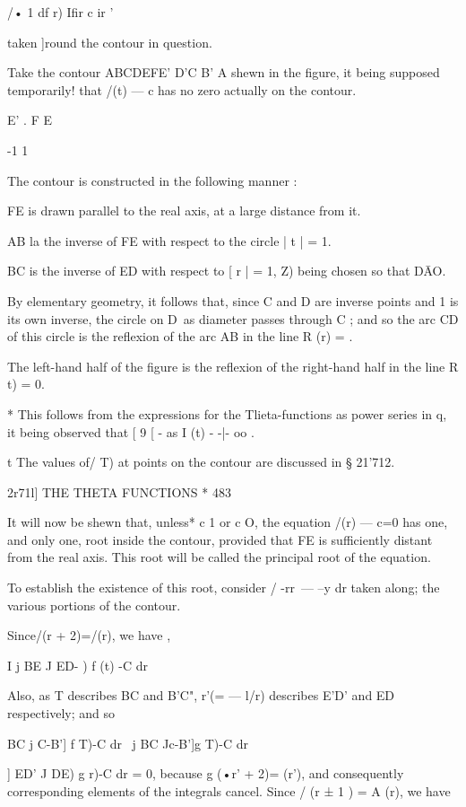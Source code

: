 /• 1 df r) Ifir c ir '

taken ]round the contour in question.

Take the contour ABCDEFE' D'C B' A shewn in the figure, it being
supposed temporarily! that /(t) — c has no zero actually on the
contour.

E' . F E

-1 1

The contour is constructed in the following manner :

FE is drawn parallel to the real axis, at a large distance from it.

AB la the inverse of FE with respect to the circle | t | = 1.

BC is the inverse of ED with respect to [ r | = 1, Z) being chosen so
that D\=AO.

By elementary geometry, it follows that, since C and D are inverse
points and 1 is its own inverse, the circle on D\ as diameter passes
through C ; and so the arc CD of this circle is the reflexion of the
arc AB in the line R (r) = .

The left-hand half of the figure is the reflexion of the right-hand
half in the line R t) = 0.

* This follows from the expressions for the Tlieta-functions as power
series in q, it being observed that [ 9 [ - as I (t) - -|- oo .

t The values of/ T) at points on the contour are discussed in §
21'712.

2r71l] THE THETA FUNCTIONS * 483

It will now be shewn that, unless* c 1 or c O, the equation /(r) — c=0
has one, and only one, root inside the contour, provided that FE is
sufficiently distant from the real axis. This root will be called the
principal root of the equation.

To establish the existence of this root, consider / -rr\ — --y dr
taken along; the various portions of the contour.

Since/(r + 2)=/(r), we have ,

I j BE J ED- ) f (t) -C dr

Also, as T describes BC and B'C", r'(= — l/r) describes E'D' and ED
respectively; and so

   BC j C-B'] f T)-C dr \ j BC Jc-B']g T)-C dr

 ] ED' J DE) g r)-C dr = 0, because g (•r' + 2)= (r'), and
consequently corresponding elements of the integrals cancel. Since /
(r ± 1 ) = A (r), we have

